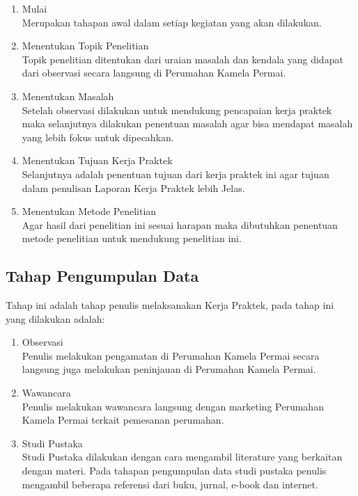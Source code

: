 \begin{enumerate}
    \item Mulai\\Merupakan tahapan awal dalam setiap kegiatan yang akan dilakukan. 
    \item Menentukan Topik Penelitian\\Topik penelitian ditentukan dari uraian masalah dan kendala yang didapat dari observasi secara langsung di Perumahan Kamela Permai.
 \item Menentukan Masalah\\Setelah observasi dilakukan untuk mendukung pencapaian kerja praktek maka selanjutnya dilakukan penentuan masalah agar bisa mendapat masalah yang lebih fokus untuk dipecahkan. 
    \item Menentukan Tujuan Kerja Praktek\\Selanjutnya adalah penentuan tujuan dari kerja praktek ini agar tujuan dalam penulisan Laporan Kerja Praktek lebih Jelas. 
 \item Menentukan Metode Penelitian\\Agar hasil dari penelitian ini sesuai harapan maka dibutuhkan penentuan metode penelitian untuk mendukung penelitian ini. 
\end{enumerate}
\subsection{Tahap Pengumpulan Data}
\par Tahap ini adalah tahap penulis melaksanakan Kerja Praktek, pada tahap ini yang dilakukan adalah:

\begin{enumerate}
    \item Observasi\\Penulis melakukan pengamatan di Perumahan Kamela Permai secara langsung juga melakukan peninjauan di Perumahan Kamela Permai. 
    \item Wawancara\\Penulis melakukan wawancara langsung dengan marketing Perumahan Kamela Permai terkait pemesanan perumahan. 
    \item Studi Pustaka\\Studi Pustaka dilakukan dengan cara mengambil literature yang berkaitan dengan materi. Pada tahapan pengumpulan data studi pustaka penulis mengambil beberapa referensi dari buku, jurnal, e-book dan internet.
\end{enumerate}
